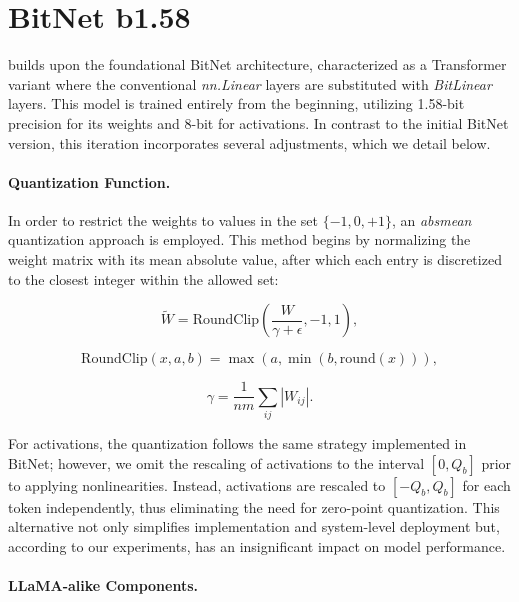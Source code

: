 \section{BitNet b1.58}

 builds upon the foundational BitNet architecture, characterized as a Transformer variant where the conventional \emph{nn.Linear} layers are substituted with \emph{BitLinear} layers. This model is trained entirely from the beginning, utilizing 1.58-bit precision for its weights and 8-bit for activations. In contrast to the initial BitNet version, this iteration incorporates several adjustments, which we detail below.

\paragraph{Quantization Function.} In order to restrict the weights to values in the set $\{-1, 0, +1\}$, an \emph{absmean} quantization approach is employed. This method begins by normalizing the weight matrix with its mean absolute value, after which each entry is discretized to the closest integer within the allowed set:

\begin{equation}
    \widetilde{W} = \mathrm{RoundClip}(\frac{W}{\gamma + \epsilon}, -1, 1),
\end{equation}

\begin{equation}
    \mathrm{RoundClip}(x, a, b) = \max(a, \min(b, \mathrm{round}(x))),
\end{equation}

\begin{equation}
    \gamma = \frac{1}{nm}\sum_{ij} |W_{ij}|.
\end{equation}

For activations, the quantization follows the same strategy implemented in BitNet; however, we omit the rescaling of activations to the interval $[0, Q_b]$ prior to applying nonlinearities. Instead, activations are rescaled to $[-Q_b, Q_b]$ for each token independently, thus eliminating the need for zero-point quantization. This alternative not only simplifies implementation and system-level deployment but, according to our experiments, has an insignificant impact on model performance.

\paragraph{LLaMA-alike Components.}

